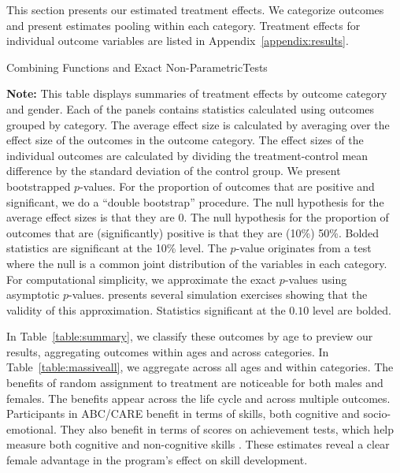 This section presents our estimated treatment effects. We categorize outcomes and present estimates pooling within each category. Treatment effects for individual outcome variables are listed in Appendix~\ref{appendix:results}.

\begin{table}[!htpb]
\begin{threeparttable}
\caption{Combining Functions and Exact Non-ParametricTests} \label{table:massiveall}
\centering

\begin{tablenotes}
\scriptsize
\item \textbf{Note:} This table displays summaries of treatment effects by outcome category and gender. Each of the panels contains statistics calculated using outcomes grouped by category. The average effect size is calculated by averaging over the effect size of the outcomes in the outcome category. The effect sizes of the individual outcomes are calculated by dividing the treatment-control mean difference by the standard deviation of the control group. We present bootstrapped $p$-values. For the proportion of outcomes that are positive and significant, we do a ``double bootstrap'' procedure. The null hypothesis for the average effect sizes is that they are 0. The null hypothesis for the proportion of outcomes that are (significantly) positive is that they are (10\%) 50\%. Bolded statistics are significant at the 10\% level. The \citet{Rosenbaum_2005_Distribution_JRSS} $p$-value originates from a test where the null is a common joint distribution of the variables in each category. For computational simplicity, we approximate the exact $p$-values using asymptotic $p$-values. \citet{Rosenbaum_2005_Distribution_JRSS} presents several simulation exercises showing that the validity of this approximation. Statistics significant at the $0.10$ level are bolded.
\end{tablenotes}
\end{threeparttable}
\end{table}

In Table~\ref{table:summary}, we classify these outcomes by age to preview our results, aggregating outcomes within ages and across categories. In Table~\ref{table:massiveall}, we aggregate across all ages and within categories. The benefits of random assignment to treatment are noticeable for both males and females. The benefits appear across the life cycle and across multiple outcomes. Participants in ABC/CARE benefit in terms of skills, both cognitive and socio-emotional. They also benefit in terms of scores on achievement tests, which help measure both cognitive and non-cognitive skills \citep{Almlund_Duckworth_etal_2011_ecoval}. These estimates reveal a clear female advantage in the program's effect on skill development.

